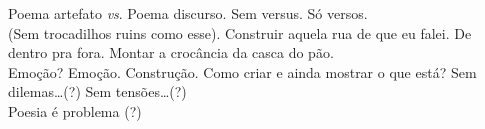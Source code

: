 \hspace{4em}Poema artefato \textit{vs}. Poema discurso. Sem versus. Só versos. \\
\indent\hspace{4em}(Sem trocadilhos ruins como esse). Construir aquela rua de
que eu falei. De dentro pra fora. Montar a crocância da casca do pão. \\
\indent\hspace{4em}Emoção? Emoção. Construção. Como criar e ainda mostrar o
que está? Sem dilemas…(?) Sem tensões…(?) \\
\indent\hspace{12em}Poesia é problema (?)